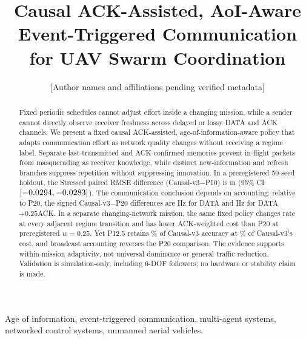 \documentclass[10pt,twocolumn,twoside]{IEEEtran}
\title{Causal ACK-Assisted, AoI-Aware Event-Triggered
Communication for UAV Swarm Coordination}
\author{[Author names and affiliations pending verified metadata]}
\begin{document}
\maketitle

\begin{abstract}
Fixed periodic schedules cannot adjust effort inside a changing mission, while
a sender cannot directly observe receiver freshness across delayed or lossy
DATA and ACK channels. We present a fixed causal ACK-assisted,
age-of-information-aware policy that
adapts communication effort as network quality changes without receiving a
regime label. Separate last-transmitted and ACK-confirmed memories prevent
in-flight packets from masquerading as receiver knowledge, while distinct
new-information and refresh branches suppress repetition without suppressing
innovation. In a preregistered 50-seed holdout, the Stressed paired
RMSE difference (Causal-v3$-$P10) is \MetricKoneMean{} m (95\% CI
$[-0.0294{},-0.0283{}]$). The communication conclusion depends on
accounting: relative to P20, the signed Causal-v3$-$P20 differences are
\MetricKtwoaMean{} Hz for DATA and \MetricKtwobMean{} Hz for
DATA$+0.25$ACK. In a separate changing-network
mission, the same fixed policy changes rate at every adjacent regime transition
and has lower ACK-weighted cost than P20 at preregistered $w=0.25$. Yet P12.5
retains \MetricElevenPonetwofiveAccuracyPercent{}\% of Causal-v3 accuracy at
\MetricElevenPonetwofiveCostPercent{}\% of Causal-v3's cost, and broadcast accounting
reverses the P20 comparison. The evidence supports within-mission adaptivity,
not universal dominance or general traffic reduction. Validation is
simulation-only, including 6-DOF followers; no hardware or stability claim is
made.
\end{abstract}

\begin{IEEEkeywords}
Age of information, event-triggered communication, multi-agent systems,
networked control systems, unmanned aerial vehicles.
\end{IEEEkeywords}













\end{document}
